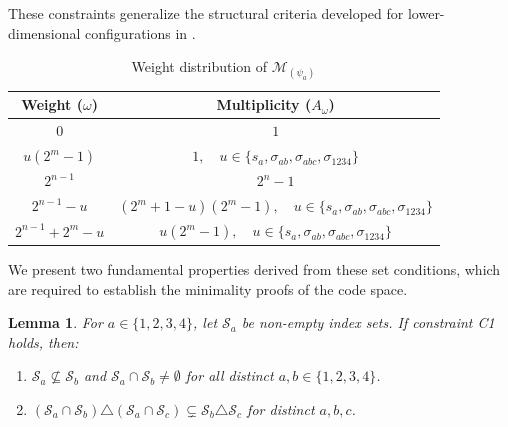\documentclass[10pt,a4paper]{amsart}
\newtheorem{lemma}{Lemma}
\begin{document}
These constraints generalize the structural criteria developed for lower-dimensional configurations in \cite{LiuLiao2022}.

\begin{table}[h]
\centering
\caption{Weight distribution of $\mathcal{M}_{(\psi_a)}$}
\label{Table_2}
\begin{tabular}{|c|c|}
\hline
Weight ($\omega$) & Multiplicity ($A_\omega$) \\
\hline
$0$ & $1$ \\
\hline
$u(2^m-1)$ & $1, \quad u \in \{s_a, \sigma_{ab}, \sigma_{abc}, \sigma_{1234}\}$ \\
\hline
$2^{n-1}$ & $2^n-1$ \\
\hline
$2^{n-1}-u$ & $(2^m+1-u)(2^m-1), \quad u \in \{s_a, \sigma_{ab}, \sigma_{abc}, \sigma_{1234}\}$ \\
\hline
$2^{n-1}+2^m-u$ & $u(2^m-1), \quad u \in \{s_a, \sigma_{ab}, \sigma_{abc}, \sigma_{1234}\}$ \\
\hline
\end{tabular}
\end{table}

We present two fundamental properties derived from these set conditions, which are required to establish the minimality proofs of the code space.
\begin{lemma}\label{lem:set_theory}
For $a \in \{1,2,3,4\}$, let $\mathcal{S}_a$ be non-empty index sets. If constraint C1 holds, then:
\begin{enumerate}
    \item $\mathcal{S}_a \not\subseteq \mathcal{S}_b$ and $\mathcal{S}_a \cap \mathcal{S}_b \neq \emptyset$ for all distinct $a, b \in \{1,2,3,4\}$.
    \item $(\mathcal{S}_a \cap \mathcal{S}_b) \triangle (\mathcal{S}_a \cap \mathcal{S}_c) \subsetneq \mathcal{S}_b \triangle \mathcal{S}_c$ for distinct $a,b,c$.
\end{enumerate}
\end{lemma}
\end{document}
